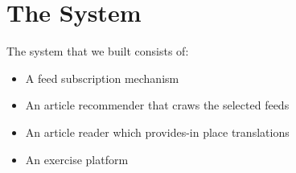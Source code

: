
\section{The System}

The system that we built consists of: 

\begin{itemize}
  \item A feed subscription mechanism
  \item An article recommender that craws the selected feeds
  \item An article reader which provides-in place translations
  \item An exercise platform 
\end{itemize}

